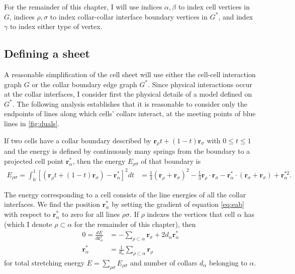 For the remainder of this chapter, I will use indices $\alpha,\beta$ to index cell vertices in $G$, indices $\rho, \sigma$ to index collar-collar interface boundary vertices in $G^*$, and index $\gamma$ to index either type of vertex.

\subsection{Defining a sheet} \label{subsec:springs}

A reasonable simplification of the cell sheet will use either the cell-cell interaction graph $G$ or the collar boundary edge graph $G^*$. 
Since physical interactions occur at the collar interfaces, I consider first the physical details of a model defined on $G^*$. 
The following analysis establishes that it is reasonable to consider only the endpoints of lines along which cells' collars interact, at the meeting points of blue lines in \cref{fig:duals}.

If two cells have a collar boundary described by $\bm{r}_\rho t + (1-t)\bm{r}_\sigma$ with $0 \leq t \leq 1$ and the energy is defined by continuously many springs from the boundary to a projected cell point $\bm{r}^*_\alpha$, then the energy $E_{\rho\sigma}$ of that boundary is 
 \begin{align}
     E_{\rho\sigma} = \int_0^1 \left[(\bm{r}_\rho t + (1-t)\bm{r}_\sigma) - \bm{r}^*_\alpha \right]^2 dt &= \frac{1}{3} (\bm{r}_\rho + \bm{r}_\sigma)^2 - \frac{1}{3} \bm{r}_\rho\cdot\bm{r}_\sigma - \bm{r}^*_\alpha \cdot (\bm{r}_\sigma + \bm{r}_\sigma) + \bm{r}^{*2}_\alpha. \label{eq:eab}
 \end{align}

The energy corresponding to a cell consists of the line energies of all the collar interfaces. 
We find the position $\bm{r}^*_\alpha$ by setting the gradient of equation \ref{eq:eab} with respect to $\bm{r}^*_\alpha$ to zero for all lines $\rho\sigma$. 
If $\rho$ indexes the vertices that cell $\alpha$ has (which I denote $\rho\subset\alpha$ for the remainder of this chapter), then 
\begin{align*}
    0 = \frac{dE}{d\bm{r}^*_\alpha} &= -\sum_{\rho\subset\alpha} \bm{r}_\sigma + 2d_\alpha\bm{r}^*_\alpha \\
    \bm{r}^*_\alpha &= \frac{1}{d_\alpha} \sum_{\rho\subset\alpha} \bm{r}_\rho
\end{align*}
\noindent for total stretching energy $E = \sum_{\rho\sigma}E_{\rho\sigma}$ and number of collars $d_\alpha$ belonging to $\alpha$.

